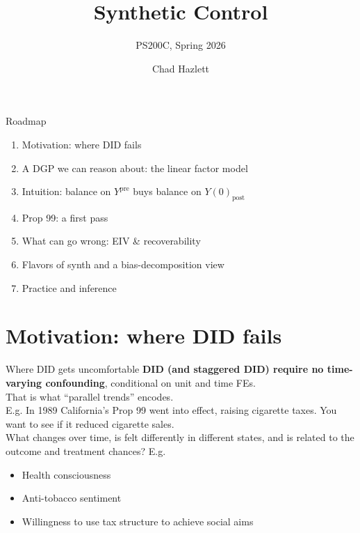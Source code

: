 \documentclass[xcolor=dvipsnames]{beamer}
\title[Synthetic Control]{Synthetic Control}
\subtitle[ ]{PS200C, Spring 2026}
\author[Hazlett]{Chad Hazlett}
\institute[UCLA]{UCLA\\[1ex]\texttt{chazlett@ucla.edu}}
\date{}
\newcommand\makegaps{\addtolength{\itemsep}{.25\baselineskip}}
\newcommand{\Ypre}{Y^{\text{pre}}}        %
\begin{document}
\subject{Talks}

\begin{frame}
  \titlepage
\end{frame}

\begin{frame}{Roadmap}
\begin{enumerate}\makegaps
  \item Motivation: where DID fails
  \item A DGP we can reason about: the linear factor model
  \item Intuition: balance on $\Ypre$ buys balance on $Y(0)_{\text{post}}$
  \item Prop 99: a first pass
  \item What can go wrong: EIV \& recoverability
  \item Flavors of synth and a bias-decomposition view
  \item Practice and inference
\end{enumerate}
\end{frame}

\section{Motivation: where DID fails}

\begin{frame}{Where DID gets uncomfortable}
\textbf{DID (and staggered DID) require no time-varying confounding}, conditional on unit and time FEs.\\[1ex]
That is what ``parallel trends'' encodes.\\[2ex]
 E.g. In 1989 California's Prop 99 went into effect, raising cigarette taxes. You want to see if it reduced cigarette sales. \\[1ex]
 What changes over time, is felt differently in different states, and is related to the outcome and treatment chances? E.g.
\begin{itemize}\makegaps
  \item Health consciousness
  \item Anti-tobacco sentiment
  \item Willingness to use tax structure to achieve social aims
\end{itemize}
\end{frame}
\end{document}

